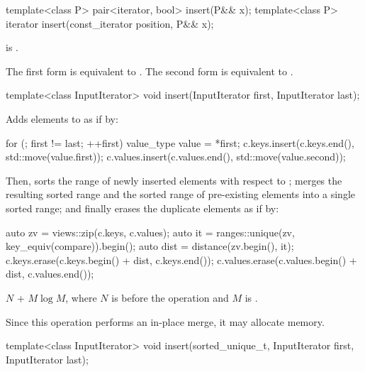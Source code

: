 %
\begin{itemdecl}
template<class P> pair<iterator, bool> insert(P&& x);
template<class P> iterator insert(const_iterator position, P&& x);
\end{itemdecl}

\begin{itemdescr}
\pnum
\constraints
{} is .

\pnum
\effects
The first form is equivalent to .
The second form is equivalent to
.
\end{itemdescr}

%
\begin{itemdecl}
template<class InputIterator>
  void insert(InputIterator first, InputIterator last);
\end{itemdecl}

\begin{itemdescr}
\pnum
\effects
Adds elements to  as if by:
\begin{codeblock}
for (; first != last; ++first) {
  value_type value = *first;
  c.keys.insert(c.keys.end(), std::move(value.first));
  c.values.insert(c.values.end(), std::move(value.second));
}
\end{codeblock}
Then, sorts the range of newly inserted elements
with respect to ;
merges the resulting sorted range and
the sorted range of pre-existing elements into a single sorted range; and
finally erases the duplicate elements as if by:
\begin{codeblock}
auto zv = views::zip(c.keys, c.values);
auto it = ranges::unique(zv, key_equiv(compare)).begin();
auto dist = distance(zv.begin(), it);
c.keys.erase(c.keys.begin() + dist, c.keys.end());
c.values.erase(c.values.begin() + dist, c.values.end());
\end{codeblock}

\pnum
\complexity
$N$ + $M \log M$,
where $N$ is  before the operation and
$M$ is .

\pnum
\remarks
Since this operation performs an in-place merge, it may allocate memory.
\end{itemdescr}

%
\begin{itemdecl}
template<class InputIterator>
  void insert(sorted_unique_t, InputIterator first, InputIterator last);
\end{itemdecl}

